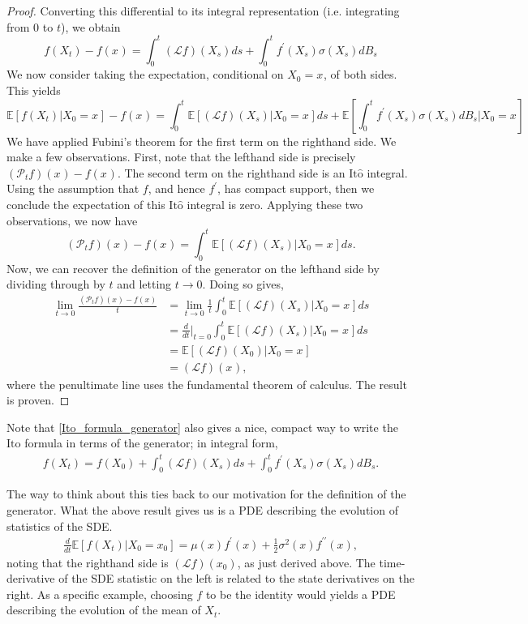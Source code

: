 \documentclass[12pt]{article}
\newcommand{\E}{\mathbb{E}}
\newcommand{\state}[1][t]{X_{#1}}
\newcommand{\stateValue}[1][t]{x_{#1}}
\newcommand{\BM}[1][t]{B_{#1}} %
\newcommand{\op}[1][t]{\mathcal{P}_{#1}} %
\newcommand{\gen}{\mathcal{L}} %
\newcommand{\ito}{\text{It}\hat{\text{o}}}
\begin{document}
\begin{proof}
Converting this differential to its integral representation (i.e. integrating from $0$ to $t$), we obtain 
\[
f(\state) - f(\stateValue[]) = \int_{0}^{t} (\gen f)(\state[s]) ds + \int_{0}^{t} f^\prime(\state[s]) \sigma(\state[s]) d\BM[s]
\]
We now consider taking the expectation, conditional on $\state[0] = \stateValue[]$, of both sides. This yields 
\[
\E[f(\state) | \state[0] = \stateValue[]] - f(\stateValue[]) = \int_{0}^{t} \E[(\gen f)(\state[s]) | \state[0] = \stateValue[]] ds + \E\left[\int_{0}^{t} f^\prime(\state[s]) \sigma(\state[s]) d\BM[s] \bigg| \state[0] = \stateValue[] \right] 
\]
We have applied Fubini's theorem for the first term on the righthand side. We make a few observations. First, note that the lefthand side is precisely $(\op f)(\stateValue[]) - f(\stateValue[])$. The second term on the righthand side 
is an $\ito$ integral. Using the assumption that $f$, and hence $f^\prime$, has compact support, then we conclude the expectation of this $\ito$ integral is zero. Applying these two observations, we now have
\[
(\op f)(\stateValue[]) - f(\stateValue[])  = \int_{0}^{t} \E[(\gen f)(\state[s]) | \state[0] = \stateValue[]] ds.
\] 
Now, we can recover the definition of the generator on the lefthand side by dividing through by $t$ and letting $t \to 0$. Doing so gives, 
\begin{align*}
\lim_{t \to 0} \frac{(\op f)(\stateValue[]) - f(\stateValue[]) }{t} 
&= \lim_{t \to 0} \frac{1}{t} \int_{0}^{t} \E[(\gen f)(\state[s]) | \state[0] = \stateValue[]] ds \\
&= \frac{d}{dt}\bigg|_{t=0} \int_{0}^{t} \E[(\gen f)(\state[s]) | \state[0] = \stateValue[]] ds \\
&= \E[(\gen f)(\state[0]) | \state[0] = \stateValue[]] \\
&= (\gen f)(\stateValue[]), 
\end{align*}
where the penultimate line uses the fundamental theorem of calculus. The result is proven. 
\end{proof}

Note that \ref{Ito_formula_generator} also gives a nice, compact way to write the $\ito$ formula in terms of the generator; in integral form, 
\begin{align}
f(\state) =  f(\state[0]) + \int_{0}^{t} (\gen f)(\state[s]) ds + \int_{0}^{t} f^\prime(\state[s]) \sigma(\state[s]) d\BM[s].
\end{align}

The way to think about this ties back to our motivation for the definition of the generator. What the above result gives us is a PDE describing 
the evolution of statistics of the SDE. 
\begin{align}
\frac{d}{dt} \E[f(\state) | \state[0] = \stateValue[0]] = \mu(x) f^\prime(x) + \frac{1}{2} \sigma^2(x) f^{\prime\prime}(x),
\end{align}
noting that the righthand side is $(\gen f)(\stateValue[0])$, as just derived above. The time-derivative of the SDE statistic on the left is 
related to the state derivatives on the right. As a specific example, choosing $f$ to be the identity would yields a PDE describing the 
evolution of the mean of $\state$. 
\end{document}
